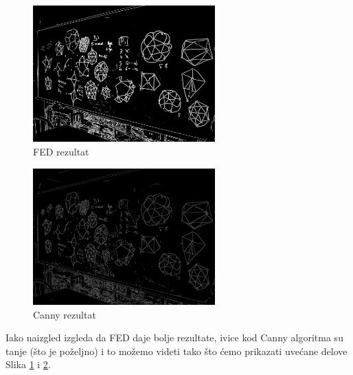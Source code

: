 \documentclass[12pt,a4paper]{article}
\theoremstyle{definition}
\theoremstyle{remark}
\theoremstyle{plain}
\begin{document}
\begin{multicols}{2}
\begin{figure}[H]
\centering
\includegraphics[width=7cm]{images/blackboard_35.png}
  \caption{FED rezultat}\label{fed_output}
\end{figure}

\columnbreak

\begin{figure}[H]
\centering
\includegraphics[width=7cm]{images/blackboard_canny.png}
  \caption{Canny rezultat}\label{canny_output}
\end{figure}
\end{multicols}

Iako naizgled izgleda da FED daje bolje rezultate, ivice kod Canny algoritma su tanje (\v sto je po\v zeljno) i to mo\v zemo videti tako \v sto \' cemo prikazati uve\' cane delove Slika \ref{fed_output} i \ref{canny_output}.
\end{document}
